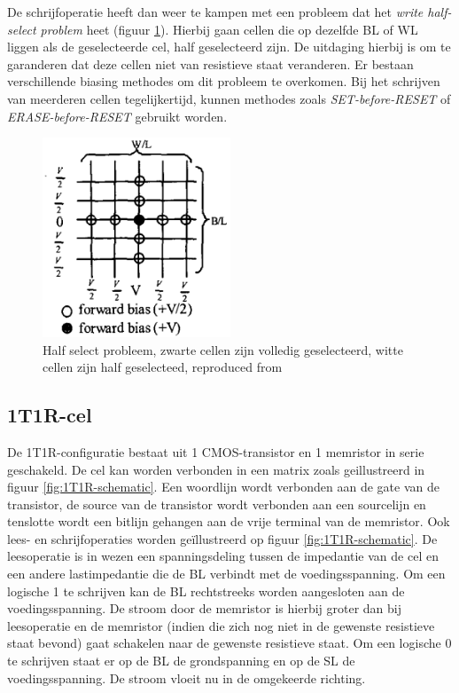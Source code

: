 De schrijfoperatie heeft dan weer te kampen met een probleem dat het \textit{write half-select problem} heet (figuur \ref{fig:halfselct}). Hierbij gaan cellen die op dezelfde BL of WL liggen als de geselecteerde cel, half geselecteerd zijn. De uitdaging hierbij is om te garanderen dat deze cellen niet van resistieve staat veranderen. Er bestaan verschillende biasing methodes \cite{1269425} om dit probleem te overkomen. Bij het schrijven van meerderen cellen tegelijkertijd, kunnen methodes zoals \textit{SET-before-RESET} of \textit{ERASE-before-RESET}\cite{5763125} gebruikt worden.

\begin{figure}
  \centering
  \includegraphics[width=0.5\textwidth]{../fig/hfdstk-cel-halfselect.png}
  \caption[Half select problem]{Half select probleem, zwarte cellen zijn volledig geselecteerd, witte cellen zijn half geselecteed, reproduced from\cite{1269425}}
  \label{fig:halfselct}
\end{figure}

\subsection{1T1R-cel}
\label{1T1R}
De 1T1R-configuratie bestaat uit 1 CMOS-transistor en 1 memristor in serie geschakeld. De cel kan  worden verbonden in een matrix zoals geillustreerd in figuur \ref{fig:1T1R-schematic}. Een woordlijn wordt verbonden aan de gate van de transistor, de source van de transistor wordt verbonden aan een sourcelijn en tenslotte wordt een bitlijn gehangen aan de vrije terminal van de memristor. Ook lees- en schrijfoperaties worden geïllustreerd op figuur \ref{fig:1T1R-schematic}. De leesoperatie is in wezen een spanningsdeling tussen de impedantie van de cel en een andere lastimpedantie die de BL verbindt met de voedingsspanning. Om een logische 1 te schrijven kan de BL rechtstreeks worden aangesloten aan de voedingsspanning. De stroom door de memristor is hierbij groter dan bij leesoperatie en de memristor (indien die zich nog niet in de gewenste resistieve staat bevond) gaat schakelen naar de gewenste resistieve staat. Om een logische 0 te schrijven staat er op de BL de grondspanning en op de SL de voedingsspanning. De stroom vloeit nu in de omgekeerde richting.

